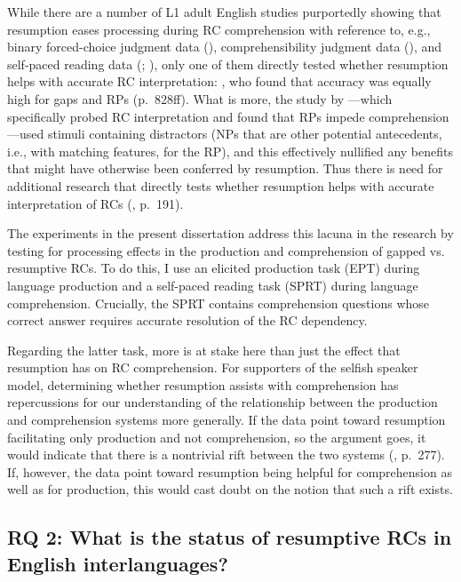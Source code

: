 While there are a number of L1 adult English studies purportedly showing that resumption eases processing during RC comprehension with reference to, e.g., binary forced-choice judgment data (\cite{ackerman.etal2018}), comprehensibility judgment data (\cite{beltrama.xiang2016}), and self-paced reading data (\cite{hammerly2022}; \cite{hofmeister.norcliffe2013}), only one of them directly tested whether resumption helps with accurate RC interpretation: \textcite{hammerly2022}, who found that accuracy was equally high for gaps and RPs (p.~828ff). What is more, the study by \textcite{morgan.etal2020}---which specifically probed RC interpretation and found that RPs impede comprehension---used stimuli containing distractors (NPs that are other potential antecedents, i.e., with matching features, for the RP), and this effectively nullified any benefits that might have otherwise been conferred by resumption. Thus there is need for additional research that directly tests whether resumption helps with accurate interpretation of RCs (\cite{meltzer-asscher2021}, p.~191).

The experiments in the present dissertation address this lacuna in the research by testing for processing effects in the production and comprehension of gapped vs. resumptive RCs. To do this, I use an elicited production task (EPT) during language production and a self-paced reading task (SPRT) during language comprehension. Crucially, the SPRT contains comprehension questions whose correct answer requires accurate resolution of the RC dependency.

Regarding the latter task, more is at stake here than just the effect that resumption has on RC comprehension. For supporters of the selfish speaker model, determining whether resumption assists with comprehension has repercussions for our understanding of the relationship between the production and comprehension systems more generally. If the data point toward resumption facilitating only production and not comprehension, so the argument goes, it would indicate that there is a nontrivial rift between the two systems (\cite{ferreira.swets2005}, p.~277). If, however, the data point toward resumption being helpful for comprehension as well as for production, this would cast doubt on the notion that such a rift exists. 

\subsection{RQ 2: What is the status of resumptive RCs in English interlanguages?}

